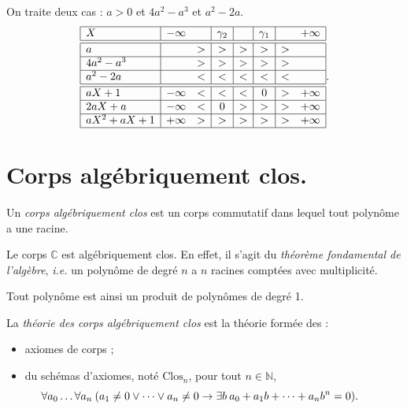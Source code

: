 \documentclass[./main]{subfiles}
\begin{document}
\begin{exm}
    On traite deux cas : $a > 0$ et $4a^2 - a^3$ et $a^2 - 2a$.
    \[
    \begin{array}{|l|cc|c|c|c|cc|}
      \hline
      X & -\infty & & \gamma_2 & & \gamma_1 & & +\infty\\ \hline \hline
      a &   & > & > & > & > & > &   \\ \hline
      4a^2 - a^3 &   & > & > & > & > & > &   \\ \hline
      a^2 - 2a &   & < & < & < & < & < &   \\ \hline \hline
      aX + 1 & -\infty & < & < & < & 0 & > & +\infty \\ \hline
      2aX + a & -\infty & < & 0 & > & > & > & +\infty \\ \hline
      a X^2 + a X + 1 & +\infty & > & > & > & > & > & +\infty \\ \hline
    \end{array}
    .\] 
  \end{exm}


  \section{Corps algébriquement clos.}

  \begin{defn}
    Un \textit{corps algébriquement clos} est un corps commutatif dans lequel tout polynôme a une racine.
  \end{defn}

  \begin{exm}
    Le corps $\mathds{C}$ est algébriquement clos. En effet, il s'agit du \textit{théorème fondamental de l'algèbre}, \textit{i.e.} un polynôme de degré $n$ a $n$ racines comptées avec multiplicité.

    Tout polynôme est ainsi un produit de polynômes de degré 1.
  \end{exm}

  \begin{defn}
    La \textit{théorie des corps algébriquement clos} est la théorie formée des :
    \begin{itemize}
      \item axiomes de corps ;
      \item du schémas d'axiomes, noté $\mathrm{Clos}_n$, pour tout $n \in \mathds{N}$, 
        \[
          \hspace{-2.5em} \forall a_0 \ldots \forall a_n \: (a_1 \neq 0 \lor \cdots \lor a_n \neq 0 \to \exists b \: a_0 + a_1 b + \cdots + a_n b^n = 0)
        .\] 
    \end{itemize}
  \end{defn}
\end{document}
